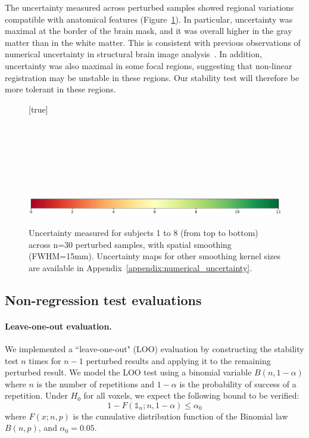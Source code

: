 \documentclass[lettersize,journal]{IEEEtran}
\begin{document}
The uncertainty measured across perturbed samples showed regional variations compatible with anatomical features (Figure~\ref{fig:uncertainty-maps}). In particular, uncertainty was
maximal at the border of the brain mask, and it was overall higher in the gray matter than in the white matter.
This is consistent with previous observations of numerical uncertainty in structural brain image analysis~\cite{salari2021accurate}.
In addition, uncertainty was also maximal in some focal regions, suggesting that non-linear registration may be unstable in these regions. Our stability test will therefore be more tolerant in these regions.
\begin{figure}
    \centering
    [true] \\
     \\
     \\
     \\
     \\
     \\
     \\
     \\
    \includegraphics*[width=.6\linewidth]{figures/colorbar_sigbit.pdf}
    \caption{Uncertainty measured for subjects 1 to 8 (from top to bottom) across n=30 perturbed samples, with spatial smoothing (FWHM=15mm). Uncertainty maps for other smoothing kernel sizes are available in Appendix~\ref{appendix:numerical_uncertainty}.}
    \label{fig:uncertainty-maps}
\end{figure}

\subsection{Non-regression test evaluations}

\paragraph{Leave-one-out evaluation.} We implemented a ``leave-one-out" (LOO) evaluation by constructing the stability test $n$ times for $n-1$ perturbed results and applying it to the remaining perturbed result.
We model the LOO test using a binomial variable $B(n,1-\alpha)$ where $n$ is the number of repetitions and $1-\alpha$ is the probability of success of a repetition. Under $H_0$ for all voxels, we expect the following bound to be verified:
\[
    1-F(\mathds{1}_n;n,1-\alpha) \leq \alpha_0
\]
where $F(x;n,p)$ is the cumulative distribution function of the Binomial law $B(n,p)$, and $\alpha_0=0.05$.
\end{document}

